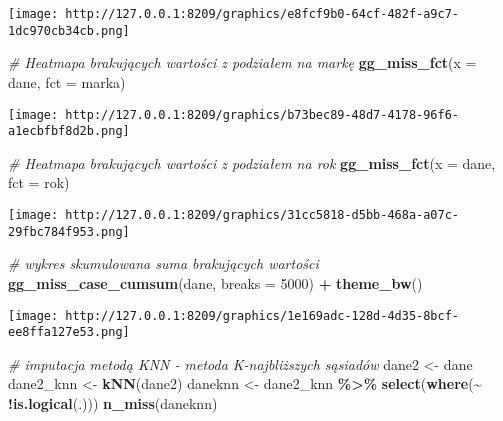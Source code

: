 \documentclass[
]{article}
\newenvironment{Shaded}{\begin{snugshade}}{\end{snugshade}}
\newcommand{\AttributeTok}[1]{\textcolor[rgb]{0.13,0.29,0.53}{#1}}
\newcommand{\CommentTok}[1]{\textcolor[rgb]{0.56,0.35,0.01}{\textit{#1}}}
\newcommand{\DecValTok}[1]{\textcolor[rgb]{0.00,0.00,0.81}{#1}}
\newcommand{\FunctionTok}[1]{\textcolor[rgb]{0.13,0.29,0.53}{\textbf{#1}}}
\newcommand{\NormalTok}[1]{#1}
\newcommand{\OtherTok}[1]{\textcolor[rgb]{0.56,0.35,0.01}{#1}}
\newcommand{\SpecialCharTok}[1]{\textcolor[rgb]{0.81,0.36,0.00}{\textbf{#1}}}
\begin{document}
\texttt{[image: http://127.0.0.1:8209/graphics/e8fcf9b0-64cf-482f-a9c7-1dc970cb34cb.png]}

\begin{Shaded}
\begin{Highlighting}[]
\CommentTok{\# Heatmapa brakujących wartości z podziałem na markę}
\FunctionTok{gg\_miss\_fct}\NormalTok{(}\AttributeTok{x =}\NormalTok{ dane, }\AttributeTok{fct =}\NormalTok{ marka)}
\end{Highlighting}
\end{Shaded}

\texttt{[image: http://127.0.0.1:8209/graphics/b73bec89-48d7-4178-96f6-a1ecbfbf8d2b.png]}

\begin{Shaded}
\begin{Highlighting}[]
\CommentTok{\# Heatmapa brakujących wartości z podziałem na rok}
\FunctionTok{gg\_miss\_fct}\NormalTok{(}\AttributeTok{x =}\NormalTok{ dane, }\AttributeTok{fct =}\NormalTok{ rok)}
\end{Highlighting}
\end{Shaded}

\texttt{[image: http://127.0.0.1:8209/graphics/31cc5818-d5bb-468a-a07c-29fbc784f953.png]}

\begin{Shaded}
\begin{Highlighting}[]
\CommentTok{\# wykres skumulowana suma brakujących wartości}
\FunctionTok{gg\_miss\_case\_cumsum}\NormalTok{(dane, }\AttributeTok{breaks =} \DecValTok{5000}\NormalTok{) }\SpecialCharTok{+} \FunctionTok{theme\_bw}\NormalTok{()}
\end{Highlighting}
\end{Shaded}

\texttt{[image: http://127.0.0.1:8209/graphics/1e169adc-128d-4d35-8bcf-ee8ffa127e53.png]}

\begin{Shaded}
\begin{Highlighting}[]
\CommentTok{\# imputacja metodą KNN {-} metoda K{-}najbliższych sąsiadów}
\NormalTok{dane2 }\OtherTok{\textless{}{-}}\NormalTok{ dane}
\NormalTok{dane2\_knn }\OtherTok{\textless{}{-}} \FunctionTok{kNN}\NormalTok{(dane2)}
\NormalTok{daneknn }\OtherTok{\textless{}{-}}\NormalTok{ dane2\_knn }\SpecialCharTok{\%\textgreater{}\%} \FunctionTok{select}\NormalTok{(}\FunctionTok{where}\NormalTok{(}\SpecialCharTok{\textasciitilde{}} \SpecialCharTok{!}\FunctionTok{is.logical}\NormalTok{(.)))}
\FunctionTok{n\_miss}\NormalTok{(daneknn)}
\end{Highlighting}
\end{Shaded}
\end{document}
